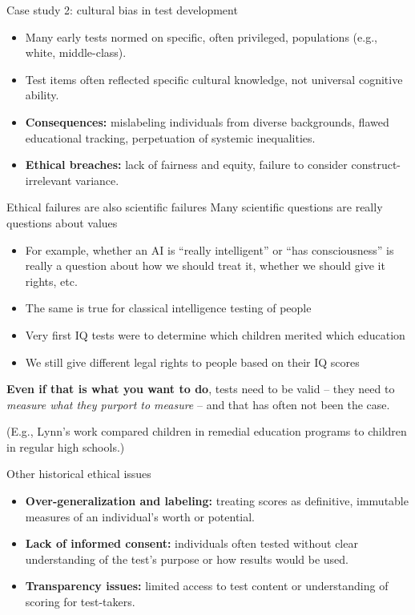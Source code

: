 \documentclass[aspectratio=169]{beamer}
\begin{document}
\begin{frame}{Case study 2: cultural bias in test development}
  \begin{itemize}
    \item Many early tests normed on specific, often privileged, populations (e.g., white, middle-class).\pause
    \item Test items often reflected specific cultural knowledge, not universal cognitive ability.\pause
    \item \textbf{Consequences:} mislabeling individuals from diverse backgrounds, flawed educational tracking, perpetuation of systemic inequalities.\pause
    \item \textbf{Ethical breaches:} lack of fairness and equity, failure to consider construct-irrelevant variance.
  \end{itemize}
\end{frame}

\begin{frame}{Ethical failures are also scientific failures}
 Many scientific questions are really questions about values\pause
  \begin{itemize}
    \item For example, whether an AI is ``really intelligent'' or ``has consciousness'' is really a question about how we should treat it, whether we should give it rights, etc.\pause
    \item The same is true for classical intelligence testing of people\pause
    \item Very first IQ tests were to determine which children merited which education\pause
    \item We still give different legal rights to people based on their IQ scores
  \end{itemize}
  \pause
  \textbf{Even if that is what you want to do}, tests need to be valid -- they need to \textit{measure what they purport to measure} -- and that has often not been the case.\pause

  (E.g., Lynn's work compared children in remedial education programs to children in regular high schools.)
\end{frame}

\begin{frame}{Other historical ethical issues}
  \begin{itemize}
    \item \textbf{Over-generalization and labeling:} treating scores as definitive, immutable measures of an individual's worth or potential.\pause
    \item \textbf{Lack of informed consent:} individuals often tested without clear understanding of the test's purpose or how results would be used.\pause
    \item \textbf{Transparency issues:} limited access to test content or understanding of scoring for test-takers.
  \end{itemize}
\end{frame}
\end{document}
